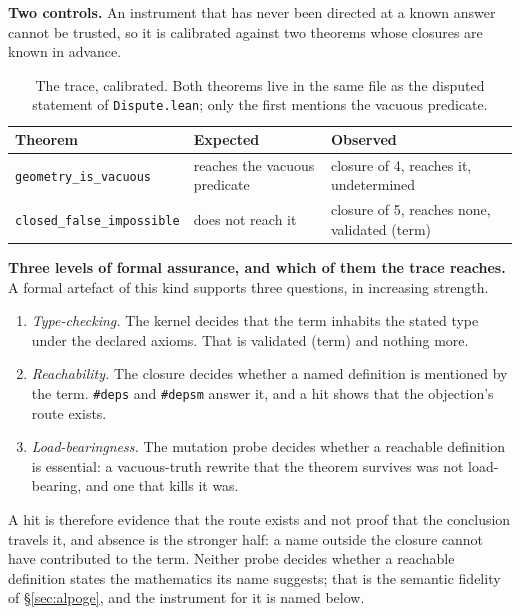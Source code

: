 \documentclass[11pt,a4paper]{article}
\newcommand{\verdict}[1]{\textsf{#1}}
\begin{document}
\textbf{Two controls.} An instrument that has never been directed at a known answer cannot
be trusted, so it is calibrated against two theorems whose closures are known in advance.

\begin{table}[htbp]
\centering
\caption{The trace, calibrated. Both theorems live in the same file as the disputed statement
of \texttt{Dispute.lean}; only the first mentions the vacuous predicate.}
\label{tab:trace}
\footnotesize
\begin{tabularx}{\textwidth}{@{}>{\raggedright\arraybackslash}p{5.4cm}>{\raggedright\arraybackslash}X>{\raggedright\arraybackslash}p{3.1cm}@{}}
\toprule
Theorem & Expected & Observed \\
\midrule
\texttt{geometry\_is\_vacuous} & reaches the vacuous predicate &
  closure of 4, reaches it, \verdict{undetermined} \\
\texttt{closed\_false\_impossible} & does not reach it &
  closure of 5, reaches none, \verdict{validated (term)} \\
\bottomrule
\end{tabularx}
\end{table}

\textbf{Three levels of formal assurance, and which of them the trace reaches.} A formal
artefact of this kind supports three questions, in increasing strength.
\begin{enumerate}
\item \emph{Type-checking.} The kernel decides that the term inhabits the stated type under the
  declared axioms. That is \verdict{validated (term)} and nothing more.
\item \emph{Reachability.} The closure decides whether a named definition is mentioned by the term.
  \texttt{\#deps} and \texttt{\#depsm} answer it, and a hit shows that the objection's route exists.
\item \emph{Load-bearingness.} The mutation probe decides whether a reachable definition is
  essential: a vacuous-truth rewrite that the theorem survives was not load-bearing, and one that
  kills it was.
\end{enumerate}
A hit is therefore evidence that the route exists and not proof that the conclusion travels it, and
absence is the stronger half: a name outside the closure cannot have contributed to the term.
Neither probe decides whether a reachable definition states the mathematics its name suggests; that
is the semantic fidelity of \S\ref{sec:alpoge}, and the instrument for it is named below.
\end{document}
